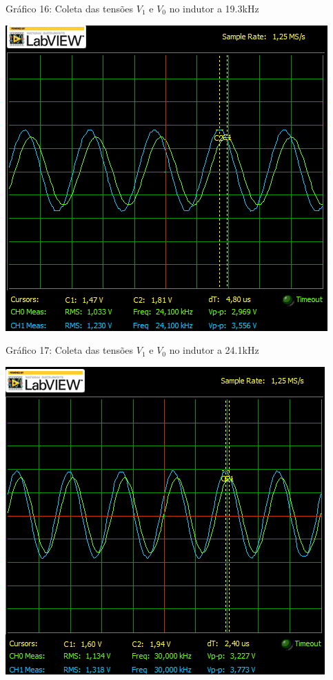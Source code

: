 \documentclass[a4 paper]{article}
\begin{document}
	\begin{center}
	Gráfico 16: Coleta das tensões $V_1$ e $V_0$ no indutor a 19.3kHz
	\end{center}

	\newpage
	\begin{table}[h]
	\centering
	\includegraphics[scale=0.7]{graficos/circ3/rgadicoa3-2-24_1}
	\end{table}
	
	\begin{center}
	Gráfico 17: Coleta das tensões $V_1$ e $V_0$ no indutor a 24.1kHz
	\end{center}

	
	\begin{table}[h]
	\centering
	\includegraphics[scale=0.7]{graficos/circ3/rgadicoa3-2-30}
	\end{table}
	
\end{document}
